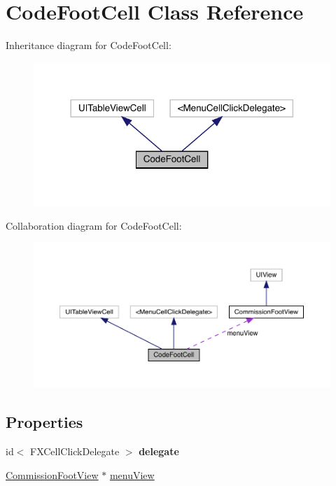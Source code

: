 \hypertarget{interface_code_foot_cell}{}\section{Code\+Foot\+Cell Class Reference}
\label{interface_code_foot_cell}


Inheritance diagram for Code\+Foot\+Cell\+:\nopagebreak
\begin{figure}[H]
\begin{center}
\leavevmode
\includegraphics[width=318pt]{interface_code_foot_cell__inherit__graph}
\end{center}
\end{figure}


Collaboration diagram for Code\+Foot\+Cell\+:\nopagebreak
\begin{figure}[H]
\begin{center}
\leavevmode
\includegraphics[width=350pt]{interface_code_foot_cell__coll__graph}
\end{center}
\end{figure}
\subsection*{Properties}
\begin{DoxyCompactItemize}
\item 
\mbox{\label{interface_code_foot_cell_a1a30b86c97c1435f79c9dae484d38c6b}} 
id$<$ F\+X\+Cell\+Click\+Delegate $>$ {\bfseries delegate}
\item 
\mbox{\hyperlink{interface_commission_foot_view}{Commission\+Foot\+View}} $\ast$ \mbox{\hyperlink{interface_code_foot_cell_a438e285ca44311faf54c54de7315d0ff}{menu\+View}}
\end{DoxyCompactItemize}


